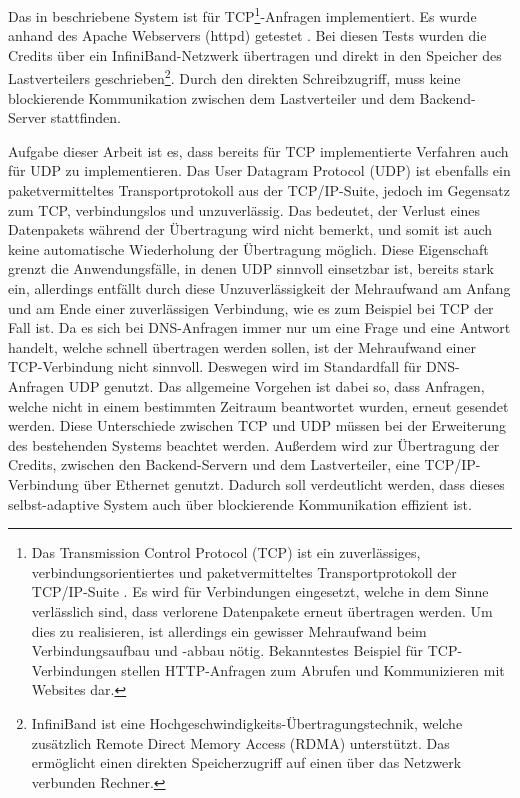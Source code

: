 \documentclass[a4paper, 12pt, BCOR10mm, DIV12, toc=bibliography, toc=listof, german]{scrbook}
\begin{document}
		Das in \cite{zinke2007,scsczile2008} beschriebene System ist für TCP\footnote{Das Transmission
		Control Protocol (TCP) \cite{rfc793} ist ein zuverlässiges, verbindungsorientiertes und
		paketvermitteltes Transportprotokoll der TCP/IP-Suite \cite{stevens1994}. Es wird für
		Verbindungen eingesetzt, welche in dem Sinne verlässlich sind, dass verlorene Datenpakete
		erneut übertragen werden. Um dies zu realisieren, ist allerdings ein gewisser Mehraufwand beim
		Verbindungsaufbau und -abbau nötig.  Bekanntestes Beispiel für TCP-Verbindungen stellen
		HTTP-Anfragen zum Abrufen und Kommunizieren mit Websites dar.}-Anfragen implementiert. Es wurde
		anhand des Apache Webservers (httpd) \cite{httpd} getestet \cite{zinke2012}. Bei diesen Tests
		wurden die Credits über ein InfiniBand-Netzwerk \cite{infiniband,zinke2007} übertragen und direkt
		in den Speicher des Lastverteilers geschrieben\footnote{InfiniBand \cite{infiniband} ist eine
		Hochgeschwindigkeits-Übertragungstechnik, welche zusätzlich Remote Direct Memory Access (RDMA)
		unterstützt. Das ermöglicht einen direkten Speicherzugriff auf einen über das Netzwerk verbunden
		Rechner.}. Durch den direkten Schreibzugriff, muss keine blockierende Kommunikation zwischen dem
		Lastverteiler und dem Backend-Server stattfinden.

		Aufgabe dieser Arbeit ist es, dass bereits für TCP implementierte Verfahren auch für UDP zu
		implementieren. Das User Datagram Protocol (UDP) \cite{stevens1994, rfc768} ist ebenfalls ein
		paketvermitteltes Transportprotokoll aus der TCP/IP-Suite, jedoch im Gegensatz zum TCP,
		verbindungslos und unzuverlässig. Das bedeutet, der Verlust eines Datenpakets während der
		Übertragung wird nicht bemerkt, und somit ist auch keine automatische Wiederholung der Übertragung
		möglich. Diese Eigenschaft grenzt die Anwendungsfälle, in denen UDP sinnvoll einsetzbar ist,
		bereits stark ein, allerdings entfällt durch diese Unzuverlässigkeit der Mehraufwand am Anfang
		und am Ende einer zuverlässigen Verbindung, wie es zum Beispiel bei TCP der Fall ist. Da es sich
		bei DNS-Anfragen immer nur um eine Frage und eine Antwort handelt, welche schnell übertragen
		werden sollen, ist der Mehraufwand einer TCP-Verbindung nicht sinnvoll. Deswegen wird im
		Standardfall für DNS-Anfragen UDP genutzt. Das allgemeine Vorgehen ist dabei so, dass Anfragen,
		welche nicht in einem bestimmten Zeitraum beantwortet wurden, erneut gesendet werden. Diese
		Unterschiede zwischen TCP und UDP müssen bei der Erweiterung des bestehenden Systems beachtet
		werden.  Außerdem wird zur Übertragung der Credits, zwischen den Backend-Servern und dem
		Lastverteiler, eine TCP/IP-Verbindung über Ethernet genutzt. Dadurch soll verdeutlicht werden,
		dass dieses selbst-adaptive System auch über blockierende Kommunikation effizient ist.
\end{document}
